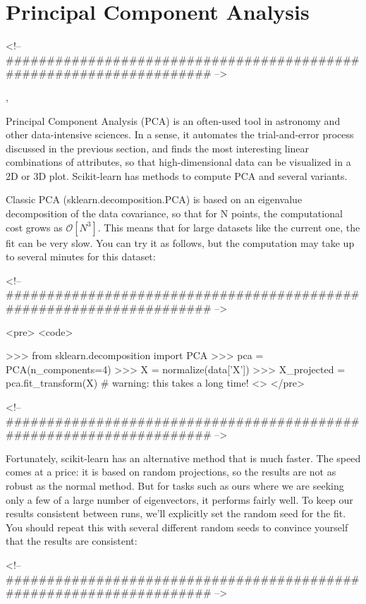\section*{Principal Component Analysis}
<!-- #################################################################### -->


,

Principal Component Analysis (PCA) is an often-used tool in astronomy and other data-intensive sciences. In a sense, it automates the trial-and-error process discussed in the previous section, and finds the most interesting linear combinations of attributes, so that high-dimensional data can be visualized in a 2D or 3D plot. Scikit-learn has methods to compute PCA and several variants. 



Classic PCA (sklearn.decomposition.PCA) is based on an eigenvalue decomposition of the data covariance, so that for N points, the computational cost grows as $\mathcal{O}[N^3]$. This means that for large datasets like the current one, the fit can be very slow. You can try it as follows, but the computation may take up to several minutes for this dataset:

<!-- #################################################################### -->


<pre>
<code>

>>> from sklearn.decomposition import PCA
>>> pca = PCA(n_components=4)
>>> X = normalize(data['X'])
>>> X_projected = pca.fit_transform(X)  # warning: this takes a long time!
<\code>
</pre>

<!-- #################################################################### -->



Fortunately, scikit-learn has an alternative method that is much faster. The speed comes at a price: it is based on random projections, so the results are not as robust as the normal method. But for tasks such as ours where we are seeking only a few of a large number of eigenvectors, it performs fairly well. To keep our results consistent between runs, we’ll explicitly set the random seed for the fit. You should repeat this with several different random seeds to convince yourself that the results are consistent:

<!-- #################################################################### -->


